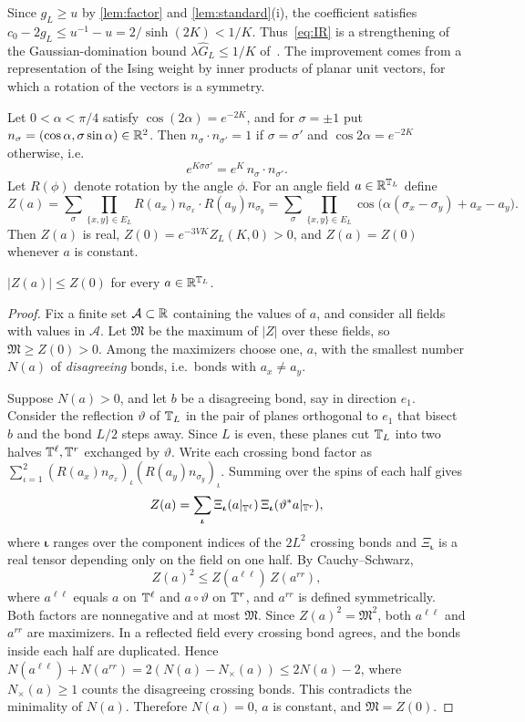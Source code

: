 Since $g_L\ge u$ by \cref{lem:factor} and \cref{lem:standard}(i), the coefficient satisfies $c_0-2g_L\le u^{-1}-u=2/\sinh(2K)<1/K$. Thus~\eqref{eq:IR} is a strengthening of the Gaussian-domination bound $\lambda\widehat G_L\le1/K$ of~\cite{FSS76}. The improvement comes from a representation of the Ising weight by inner products of planar unit vectors, for which a rotation of the vectors is a symmetry.

Let $0<\alpha<\pi/4$ satisfy $\cos(2\alpha)=e^{-2K}$, and for $\sigma=\pm1$ put $n_\sigma=(\cos\alpha,\sigma\sin\alpha)\in\mathbb R^2$. Then $n_\sigma\cdot n_{\sigma'}=1$ if $\sigma=\sigma'$ and $\cos2\alpha=e^{-2K}$ otherwise, i.e.\
\[
 e^{K\sigma\sigma'}=e^K\,n_\sigma\cdot n_{\sigma'} .
\]
Let $R(\phi)$ denote rotation by the angle $\phi$. For an angle field $a\in\mathbb R^{\mathbb T_L}$ define
\[
 Z(a)=\sum_\sigma\prod_{\{x,y\}\in E_L}R(a_x)n_{\sigma_x}\cdot R(a_y)n_{\sigma_y}
 =\sum_\sigma\prod_{\{x,y\}\in E_L}\cos\bigl(\alpha(\sigma_x-\sigma_y)+a_x-a_y\bigr).
\]
Then $Z(a)$ is real, $Z(0)=e^{-3VK}Z_L(K,0)>0$, and $Z(a)=Z(0)$ whenever $a$ is constant.

\begin{lemma}\label{lem:rotation}
$|Z(a)|\le Z(0)$ for every $a\in\mathbb R^{\mathbb T_L}$.
\end{lemma}

\begin{proof}
Fix a finite set $\mathcal A\subset\mathbb R$ containing the values of $a$, and consider all fields with values in $\mathcal A$. Let $\mathfrak M$ be the maximum of $|Z|$ over these fields, so $\mathfrak M\ge Z(0)>0$. Among the maximizers choose one, $a$, with the smallest number $N(a)$ of \emph{disagreeing} bonds, i.e.\ bonds with $a_x\ne a_y$.

Suppose $N(a)>0$, and let $b$ be a disagreeing bond, say in direction $e_1$. Consider the reflection $\vartheta$ of $\mathbb T_L$ in the pair of planes orthogonal to $e_1$ that bisect $b$ and the bond $L/2$ steps away. Since $L$ is even, these planes cut $\mathbb T_L$ into two halves $\mathbb T^\ell,\mathbb T^r$ exchanged by $\vartheta$. Write each crossing bond factor as $\sum_{\iota=1}^2(R(a_x)n_{\sigma_x})_\iota(R(a_y)n_{\sigma_y})_\iota$. Summing over the spins of each half gives
\[
 Z(a)=\sum_{\boldsymbol\iota}\Xi_{\boldsymbol\iota}(a|_{\mathbb T^\ell})\,\Xi_{\boldsymbol\iota}(\vartheta^*a|_{\mathbb T^r}),
\]
where $\boldsymbol\iota$ ranges over the component indices of the $2L^2$ crossing bonds and $\Xi_{\boldsymbol\iota}$ is a real tensor depending only on the field on one half. By Cauchy--Schwarz,
\[
 Z(a)^2\le Z(a^{\ell\ell})\,Z(a^{rr}),
\]
where $a^{\ell\ell}$ equals $a$ on $\mathbb T^\ell$ and $a\circ\vartheta$ on $\mathbb T^r$, and $a^{rr}$ is defined symmetrically. Both factors are nonnegative and at most $\mathfrak M$. Since $Z(a)^2=\mathfrak M^2$, both $a^{\ell\ell}$ and $a^{rr}$ are maximizers. In a reflected field every crossing bond agrees, and the bonds inside each half are duplicated. Hence $N(a^{\ell\ell})+N(a^{rr})=2(N(a)-N_\times(a))\le2N(a)-2$, where $N_\times(a)\ge1$ counts the disagreeing crossing bonds. This contradicts the minimality of $N(a)$. Therefore $N(a)=0$, $a$ is constant, and $\mathfrak M=Z(0)$.
\end{proof}

